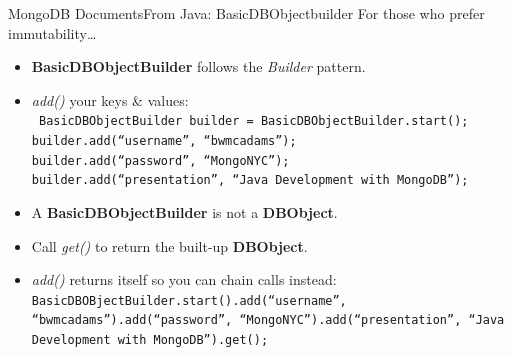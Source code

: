 \documentclass{beamer}
\begin{document}
\begin{frame}{MongoDB Documents}{From Java: BasicDBObjectbuilder}
    For those who prefer immutability\dots
    \begin{itemize}
        \item {\bf BasicDBObjectBuilder} follows the {\em Builder} pattern.
        \item<2-> {\em add()} your keys \& values:\\
        \texttt{
            \tiny
            BasicDBObjectBuilder builder = BasicDBObjectBuilder.start();\\
            builder.add(``username'', ``bwmcadams'');\\
            builder.add(``password'', ``MongoNYC'');\\
            builder.add(``presentation'', ``Java Development with MongoDB'');
        }
        \item<3-> A {\bf BasicDBObjectBuilder} is not a {\bf DBObject}. 
        \item<3-> Call {\em get()} to return the built-up {\bf DBObject}.
        \item<4-> {\em add()} returns itself so you can chain calls instead: \texttt{\tiny BasicDBOBjectBuilder.start().add(``username'', ``bwmcadams'').add(``password'', ``MongoNYC'').add(``presentation'', ``Java Development with MongoDB'').get();}
    \end{itemize}
\end{frame}
\end{document}
